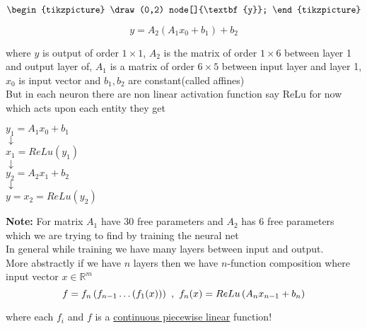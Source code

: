 \documentclass[a4paper]{article}
\numberwithin{equation}{section}
\begin{document}
\begin{itemize}
\[\begin{tikzpicture}
    \draw(0,2) node[]{\textbf{y}};
\end{tikzpicture}\]

\[y=A_2(A_1x_0+b_1)+b_2\]

where $y$ is output of order $1 \times 1$, $A_2$ is the matrix of order $1\times 6$ between layer 1 and output layer of, $A_1$ is a matrix of order $6 \times 5$ between input layer and layer 1, $x_0$ is input vector and $b_1,b_2$ are constant(called affines)\\

But in each neuron there are non linear activation function say ReLu for now which acts upon each entity they get

\begin{center}
    $y_1=A_1x_0+b_1$\\
    $\downarrow$\\
    $x_1=ReLu(y_1)$\\
    $\downarrow$\\
    $y_2=A_2x_1+b_2$\\
    $\downarrow$\\
    $y=x_2=ReLu(y_2)$
\end{center}

\textbf{Note:} For matrix $A_1$ have 30 free parameters and $A_2$ has 6 free parameters which we are trying to find by training the neural net\\
In general while training we have many layers between input and output.\\

More abstractly if we have $n$ layers then we have $n$-function composition where input vector $x\in \mathbb{R}^m$ 
\[f=f_n\left(f_{n-1} \dots \left(f_1(x)\right)\right) \hspace{3.5pt},\hspace{3.5pt} f_n(x)=ReLu\left(A_nx_{n-1}+b_n\right) \]

where each $f_i$ and $f$ is a \underline{continuous piecewise linear} function!\\


\end{itemize}
\end{document}
